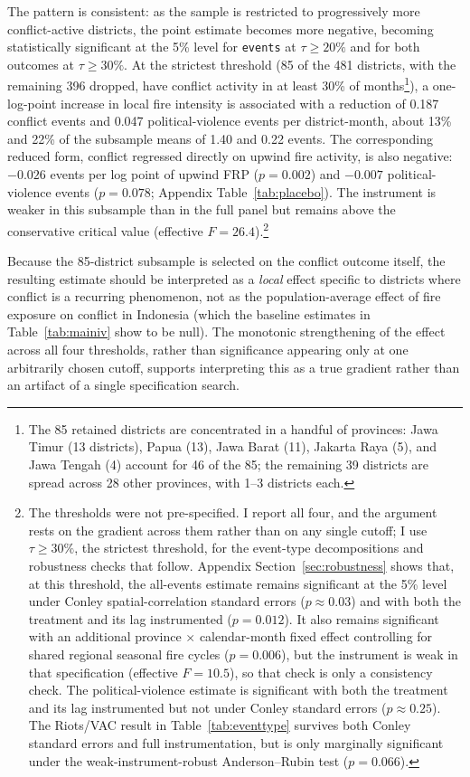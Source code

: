 \documentclass[12pt]{article}
\begin{document}
The pattern is consistent: as the sample is restricted to progressively more conflict-active districts, the point estimate becomes more negative, becoming statistically significant at the 5\% level for \texttt{events} at $\tau \geq 20\%$ and for both outcomes at $\tau \geq 30\%$. At the strictest threshold (85 of the 481 districts, with the remaining 396 dropped, have conflict activity in at least 30\% of months\footnote{The 85 retained districts are concentrated in a handful of provinces: Jawa Timur (13 districts), Papua (13), Jawa Barat (11), Jakarta Raya (5), and Jawa Tengah (4) account for 46 of the 85; the remaining 39 districts are spread across 28 other provinces, with 1--3 districts each.}), a one-log-point increase in local fire intensity is associated with a reduction of 0.187 conflict events and 0.047 political-violence events per district-month, about 13\% and 22\% of the subsample means of 1.40 and 0.22 events. The corresponding reduced form, conflict regressed directly on upwind fire activity, is also negative: $-0.026$ events per log point of upwind FRP ($p=0.002$) and $-0.007$ political-violence events ($p=0.078$; Appendix Table~\ref{tab:placebo}). The instrument is weaker in this subsample than in the full panel but remains above the conservative critical value (effective $F = 26.4$).\footnote{The thresholds were not pre-specified. I report all four, and the argument rests on the gradient across them rather than on any single cutoff; I use $\tau \geq 30\%$, the strictest threshold, for the event-type decompositions and robustness checks that follow. Appendix Section~\ref{sec:robustness} shows that, at this threshold, the all-events estimate remains significant at the 5\% level under Conley spatial-correlation standard errors ($p \approx 0.03$) and with both the treatment and its lag instrumented ($p=0.012$). It also remains significant with an additional province $\times$ calendar-month fixed effect controlling for shared regional seasonal fire cycles ($p=0.006$), but the instrument is weak in that specification (effective $F = 10.5$), so that check is only a consistency check. The political-violence estimate is significant with both the treatment and its lag instrumented but not under Conley standard errors ($p \approx 0.25$). The Riots/VAC result in Table~\ref{tab:eventtype} survives both Conley standard errors and full instrumentation, but is only marginally significant under the weak-instrument-robust Anderson--Rubin test ($p=0.066$).}

Because the 85-district subsample is selected on the conflict outcome itself, the resulting estimate should be interpreted as a \emph{local} effect specific to districts where conflict is a recurring phenomenon, not as the population-average effect of fire exposure on conflict in Indonesia (which the baseline estimates in Table~\ref{tab:mainiv} show to be null). The monotonic strengthening of the effect across all four thresholds, rather than significance appearing only at one arbitrarily chosen cutoff, supports interpreting this as a true gradient rather than an artifact of a single specification search.
\end{document}
